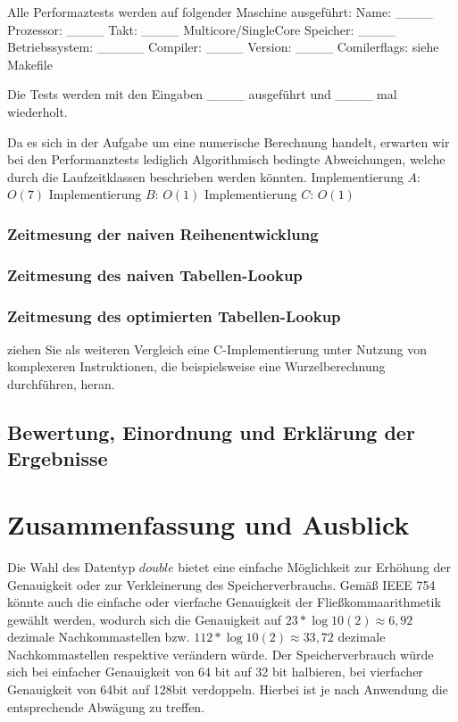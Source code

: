 \documentclass[course=erap]{aspdoc}
\begin{document}
    Alle Performaztests werden auf folgender Maschine ausgeführt: Name: ____ Prozessor: ____ Takt: ____ Multicore/SingleCore Speicher: ____ Betriebssystem: _____ Compiler: ____ Version: ____ Comilerflags: siehe Makefile

    Die Tests werden mit den Eingaben ____ ausgeführt und ____ mal wiederholt.

    Da es sich in der Aufgabe um eine numerische Berechnung handelt, erwarten wir bei den Performanztests lediglich Algorithmisch bedingte Abweichungen, welche durch die Laufzeitklassen beschrieben werden könnten.
    Implementierung $A$: $O(7)$
    Implementierung $B$: $O(1)$
    Implementierung $C$: $O(1)$

    \subsubsection{Zeitmesung der naiven Reihenentwicklung}

    \subsubsection{Zeitmesung des naiven Tabellen-Lookup}

    \subsubsection{Zeitmesung des optimierten Tabellen-Lookup}
    ziehen Sie als weiteren Vergleich eine C-Implementierung unter Nutzung von komplexeren Instruktionen, die beispielsweise eine Wurzelberechnung durchführen, heran.

    \subsection{Bewertung, Einordnung und Erklärung der Ergebnisse}


    \section{Zusammenfassung und Ausblick}
    Die Wahl des Datentyp $double$ bietet eine einfache Möglichkeit zur Erhöhung der Genauigkeit oder zur Verkleinerung des Speicherverbrauchs.
    Gemäß IEEE 754 ~\cite{StandardforBinaryFloating} könnte auch die einfache oder vierfache Genauigkeit der
    Fließkommaarithmetik gewählt werden, wodurch sich die Genauigkeit auf $23*\log10(2) \approx 6,92$ dezimale Nachkommastellen
    bzw. $112*\log10(2) \approx 33,72$ dezimale Nachkommastellen respektive verändern würde.
    Der Speicherverbrauch würde sich bei einfacher Genauigkeit von 64 bit auf 32 bit halbieren, bei vierfacher Genauigkeit von 64bit auf 128bit verdoppeln.
    Hierbei ist je nach Anwendung die entsprechende Abwägung zu treffen.


    
    
\end{document}
